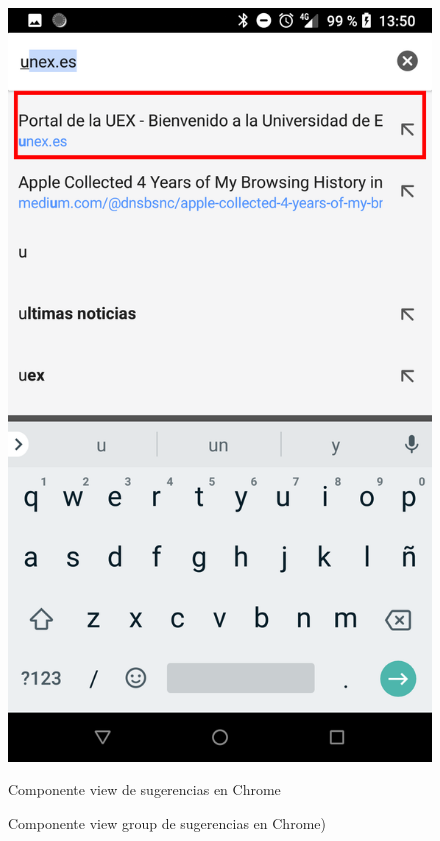 \documentclass[12pt,a4paper,oneside]{book} %
\begin{document}
\begin{itemize}
\begin{figure}[H]
	\begin{center}
     	\includegraphics[scale=0.15]{pictures/IRL/chrome/chrome_view.png}
	    	\caption{Componente view group de sugerencias en Chrome)}{Componente view de sugerencias en Chrome}
    	\label{fig:Componente view group de Chrome}
	\end{center}
\end{figure}
\end{itemize}
\end{document}
